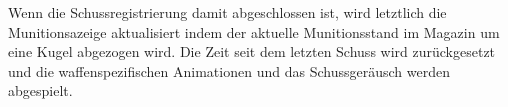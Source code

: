 Wenn die Schussregistrierung damit abgeschlossen ist, wird letztlich die Munitionsazeige aktualisiert indem der aktuelle Munitionsstand im Magazin um eine Kugel abgezogen wird.
Die Zeit seit dem letzten Schuss wird zurückgesetzt und die waffenspezifischen Animationen und das Schussgeräusch werden abgespielt. 










